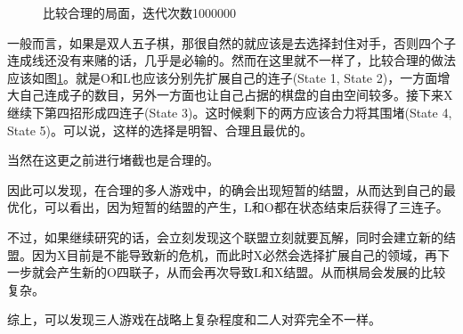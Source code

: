 \documentclass[9pt,twocolumn,twoside]{osajnl}
\begin{document}
\begin{adjustwidth}{2em}{}
		\begin{figure}[htbp]
			\centering
			\caption{比较合理的局面，迭代次数1000000}
			\label{caseStudy}
		\end{figure}
	
	一般而言，如果是双人五子棋，那很自然的就应该是去选择封住对手，否则四个子连成线还没有来赌的话，几乎是必输的。然而在这里就不一样了，比较合理的做法应该如图\ref{caseStudy}。就是O和L也应该分别先扩展自己的连子(State 1, State 2)，一方面增大自己连成子的数目，另外一方面也让自己占据的棋盘的自由空间较多。接下来X继续下第四招形成四连子(State 3)。这时候剩下的两方应该合力将其围堵(State 4, State 5)。可以说，这样的选择是明智、合理且最优的。
	
	当然在这更之前进行堵截也是合理的。
	
	因此可以发现，在合理的多人游戏中，的确会出现短暂的结盟，从而达到自己的最优化，可以看出，因为短暂的结盟的产生，L和O都在状态结束后获得了三连子。
	
	不过，如果继续研究的话，会立刻发现这个联盟立刻就要瓦解，同时会建立新的结盟。因为X目前是不能导致新的危机，而此时X必然会选择扩展自己的领域，再下一步就会产生新的O四联子，从而会再次导致L和X结盟。从而棋局会发展的比较复杂。
	
	
	综上，可以发现三人游戏在战略上复杂程度和二人对弈完全不一样。
	
\end{adjustwidth}
\end{document}
